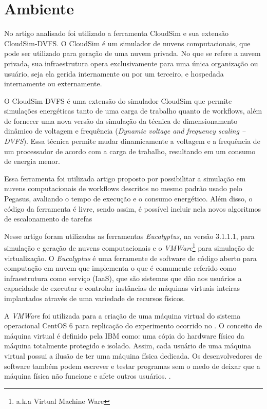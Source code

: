 \section{Ambiente}

No artigo analisado foi utilizado a ferramenta CloudSim e sua extensão CloudSim-DVFS. O CloudSim é
um simulador de nuvens computacionais, que pode ser utilizado para geração de uma nuvem privada.
No que se refere a nuvem privada, sua infraestrutura opera exclusivamente para uma única organização ou usuário,
seja ela gerida internamente ou por um terceiro, e hospedada internamente ou externamente.

O CloudSim-DVFS é uma extensão do simulador CloudSim que permite simulações energéticas tanto de uma
carga de trabalho quanto de workflows, além de fornecer uma nova versão da simulação da técnica
de dimensionamento dinâmico de voltagem e frequência (\textit{Dynamic voltage and frequency scaling – DVFS}).
Essa técnica permite mudar dinamicamente a voltagem e a frequência de um processador de acordo com
a carga de trabalho, resultando em um consumo de energia menor. \cite{elaine_et_al:14}

Essa ferramenta foi utilizada artigo proposto por possibilitar a simulação em nuvens computacionais de workflows descritos no mesmo padrão usado pelo Pegasus, avaliando o tempo de execução e o consumo energético. Além disso, o código da ferramenta é livre, sendo assim, é possível incluir nela novos algoritmos de escalonamento de tarefas

Nesse artigo foram utilizadas as ferramentas \textit{Eucalyptus}, na versão 3.1.1.1, para simulação e geração de nuvens computacionais e o \textit{VMWare}\footnote{a.k.a Virtual Machine Ware} para simulação de virtualização. O \textit{Eucalyptus}
é uma ferramente de software de código aberto para computação em nuvem que implementa o que é comumente referido
como infraestrutura como serviço (IaaS), que são sistemas que dão aos usuários a capacidade de executar e controlar
instâncias de máquinas virtuais inteiras implantados através de uma variedade de recursos físicos. \cite{nurmi_2009}

A \textit{VMWare} foi utilizada para a criação de uma máquina virtual do sistema operacional CentOS 6 para replicação do experimento
ocorrido no \cite{elaine_et_al:14}. O conceito de máquina virtual é definido pela IBM como: uma cópia do hardware físico da máquina totalmente protegido
e isolado. Assim, cada usuário de uma máquina virtual possui a ilusão de ter uma máquina física dedicada.
Os desenvolvedores de software também podem escrever e testar programas sem o medo de deixar que a máquina física
não funcione e afete outros usuários. \cite{sugerman2001virtualizing}.
